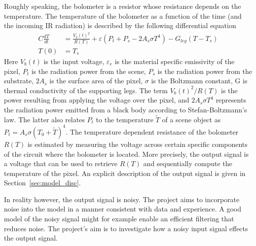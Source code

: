 
Roughly speaking, the bolometer is a resistor whose resistance depends on the temperature.
The temperature of the bolometer as a function of the time (and the incoming IR radiation) is described by the following differential equation
\begin{align} \label{eq:heat_balance_equation}
 C\frac{dT}{dt}&=\frac{V_b(t)^2}{R(T)}+\varepsilon(P_t+P_s -2A_s \sigma T^4)-G_{leg}(T-T_s) \\
 T(0)&=T_s	\nonumber
\end{align}
Here $V_b(t)$ is the input voltage, $\varepsilon_e$ is the material specific emissivity of the pixel, $P_t$ is the radiation power from the scene, $P_s$ is the radiation power from the substrate, $2A_s$ is the surface area of the pixel, $\sigma$ is the Boltzmann constant, G is thermal conductivity of the supporting legs. The term $V_b(t)^2/R(T)$ is the power resulting from applying the voltage over the pixel, and $2A_s \sigma T^4$ represents the radiation power emitted from a black body according to Stefan-Boltzmann's law. The latter also relates $P_t$ to the temperature $\tilde T$ of a scene object as $P_t = A_s \sigma (T_0+\tilde T)^4$.
The temperature dependent resistance of the bolometer $R(T)$ is estimated by measuring the voltage across certain specific components of the circuit where the bolometer is located. More precisely, the output signal is a voltage that can be used to retrieve $R(T)$ and sequentially compute the temperature of the pixel. An explicit description of the output signal is given in Section~\ref{sec:model_disc}.


In reality however, the output signal is noisy. The project aims to incorporate noise into the model in a manner consistent with data and experience. A good model of the noisy signal might for example enable an efficient filtering that reduces noise. The project's aim is to investigate how a noisy input signal effects the output signal.

